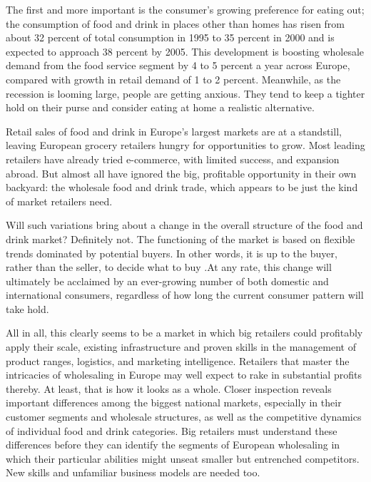 \qquad [A] The first and more important is the consumer’s growing preference for eating out; the consumption of food and drink in places other than homes has risen from about 32 percent of total consumption in 1995 to 35 percent in 2000 and is expected to approach 38 percent by 2005. This development is boosting wholesale demand from the food service segment by 4 to 5 percent a year across Europe, compared with growth in retail demand of 1 to 2 percent. Meanwhile, as the recession is looming large, people are getting anxious. They tend to keep a tighter hold on their purse and consider eating at home a realistic alternative.

\qquad [B] Retail sales of food and drink in Europe’s largest markets are at a standstill, leaving European grocery retailers hungry for opportunities to grow. Most leading retailers have already tried e-commerce, with limited success, and expansion abroad. But almost all have ignored the big, profitable opportunity in their own backyard: the wholesale food and drink trade, which appears to be just the kind of market retailers need.

\qquad [C] Will such variations bring about a change in the overall structure of the food and drink market? Definitely not. The functioning of the market is based on flexible trends dominated by potential buyers. In other words, it is up to the buyer, rather than the seller, to decide what to buy .At any rate, this change will ultimately be acclaimed by an ever-growing number of both domestic and international consumers, regardless of how long the current consumer pattern will take hold.

\qquad [D] All in all, this clearly seems to be a market in which big retailers could profitably apply their scale, existing infrastructure and proven skills in the management of product ranges, logistics, and marketing intelligence. Retailers that master the intricacies of wholesaling in Europe may well expect to rake in substantial profits thereby. At least, that is how it looks as a whole. Closer inspection reveals important differences among the biggest national markets, especially in their customer segments and wholesale structures, as well as the competitive dynamics of individual food and drink categories. Big retailers must understand these differences before they can identify the segments of European wholesaling in which their particular abilities might unseat smaller but entrenched competitors. New skills and unfamiliar business models are needed too.

